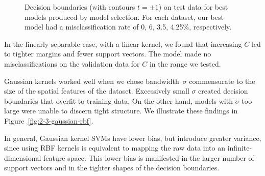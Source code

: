 \documentclass{article}
\begin{document}
\begin{multicols}{2}
\begin{figure}[t]
   \caption{Decision boundaries (with contours $t = \pm1$)
   on test data for best models produced by model selection.
   For each dataset, our best model had a misclassification rate of 0, 6, 3.5, 4.25\%, respectively.}
   \label{fig:2-3-model-selection}
\end{figure}

In the linearly separable case, with a linear kernel,
we found that increasing $C$ led to tighter margins and fewer support vectors.
The model made no misclassifications on the validation data for $C$ in the range we tested.

Gaussian kernels worked well when we chose bandwidth~$\sigma$
commensurate to the size of the spatial features of the dataset.
Excessively small $\sigma$ created decision boundaries that overfit to training data.
On the other hand, models with $\sigma$ too large were unable to discern tight structure.
We illustrate these findings in Figure~\ref{fig:2-3-gaussian-rbf}.

In general,
Gaussian kernel SVMs have lower bias,
but introduce greater variance,
since using RBF kernels is equivalent to
mapping the raw data into an infinite-dimensional feature space.
This lower bias is manifested
in the larger number of support vectors
and in the tighter shapes of the decision boundaries.


\end{multicols}
\end{document}
